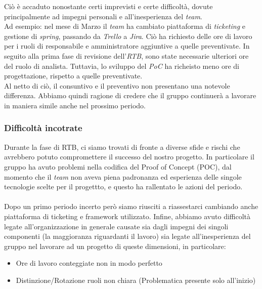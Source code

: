 \documentclass[5pt]{article}
\begin{document}
    Ciò è accaduto nonostante certi imprevisti e certe difficoltà, dovute principalmente ad impegni personali e all'inesperienza del \textit{team}. \\
    Ad esempio: nel mese di Marzo il \textit{team} ha cambiato piattaforma di \textit{ticketing} e gestione di \textit{spring}, passando da \textit{Trello} a \textit{Jira}.
    Ciò ha richiesto delle ore di lavoro per i ruoli di responsabile e amministratore aggiuntive a quelle preventivate.
    In seguito alla prima fase di revisione dell'\textit{RTB}, sono state necessarie ulteriori ore del ruolo di analista.
    Tuttavia, lo sviluppo del \textit{PoC} ha richeisto meno ore di progettazione, rispetto a quelle preventivate.\\
    Al netto di ciò, il consuntivo e il preventivo non presentano una notevole differenza. Abbiamo quindi ragione di credere che il gruppo continuerà 
    a lavorare in maniera simile anche nel prossimo periodo.

    \subsubsection{Difficoltà incotrate}
Durante la fase di RTB, ci siamo trovati di fronte a diverse sfide e rischi che avrebbero potuto compromettere il successo del nostro progetto. 
In particolare il gruppo ha avuto problemi nella codifica del Proof of Concept (POC), dal momento che il \textit{team} non aveva piena padronanza ed esperienza delle singole tecnologie scelte per il progettto, e questo ha rallentato le azioni del periodo.\\\\
Dopo un primo periodo incerto però siamo riusciti a riassestarci cambiando anche piattaforma di ticketing e framework utilizzato. 
Infine, abbiamo avuto difficoltà legate all'organizzazione in generale causate sia dagli impegni dei singoli componenti (la maggioranza riguardanti il lavoro) sia legate all'inesperienza del gruppo nel lavorare ad un progetto di queste dimensioni, in particolare:
\begin{itemize}
    \item Ore di lavoro conteggiate non in modo perfetto
    \item Distinzione/Rotazione ruoli non chiara (Problematica presente solo all'inizio)
\end{itemize}
    
\end{document}
